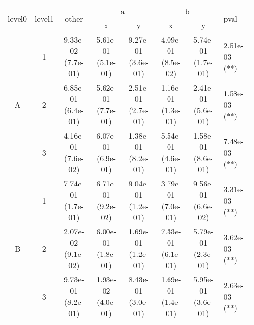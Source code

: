 \begin{tabular}{cccccccl}
\toprule
\multirow{2}{*}{level0} & \multirow{2}{*}{level1}& \multirow{2}{*}{other}&\multicolumn{2}{c}{a}&\multicolumn{2}{c}{b}& \multirow{2}{*}{pval}\tabularnewline
\cmidrule(lr){4-5}
\cmidrule(lr){6-7}
&&&x&y&x&y\tabularnewline
\midrule
\multirow{3}{*}{A}&1& 9.33e-02 (7.7e-01)& 5.61e-01 (5.1e-01)& 9.27e-01 (3.6e-01)& 4.09e-01 (8.5e-02)& 5.74e-01 (1.7e-01)& 2.51e-03 (**)\tabularnewline
&2& 6.85e-01 (6.4e-01)& 5.62e-01 (7.7e-01)& 2.51e-01 (2.7e-01)& 1.16e-01 (1.3e-01)& 2.41e-01 (5.6e-01)& 1.58e-03 (**)\tabularnewline
&3& 4.16e-01 (7.6e-02)& 6.07e-01 (6.9e-01)& 1.38e-01 (8.2e-01)& 5.54e-01 (4.6e-01)& 1.58e-01 (8.6e-01)& 7.48e-03 (**)\tabularnewline
\midrule
\multirow{3}{*}{B}&1& 7.74e-01 (1.7e-01)& 6.71e-01 (9.2e-02)& 9.04e-01 (1.2e-01)& 3.79e-01 (7.0e-01)& 9.56e-01 (6.6e-02)& 3.31e-03 (**)\tabularnewline
&2& 2.07e-02 (9.1e-02)& 6.00e-01 (1.8e-01)& 1.69e-01 (1.2e-01)& 7.33e-01 (6.1e-01)& 5.79e-01 (2.3e-01)& 3.62e-03 (**)\tabularnewline
&3& 9.73e-01 (8.2e-01)& 1.93e-02 (4.0e-01)& 8.43e-01 (3.0e-01)& 1.69e-01 (1.4e-01)& 5.95e-01 (3.6e-01)& 2.63e-03 (**)\tabularnewline
\bottomrule
\end{tabular}
